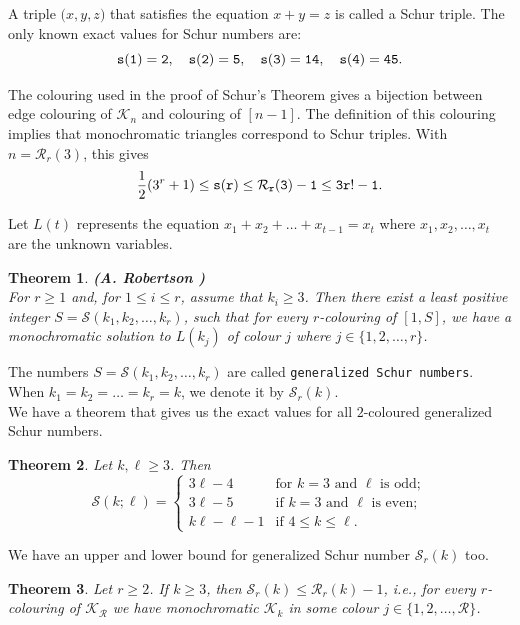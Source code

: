 \documentclass[12pt]{report}
\def\K{\mathcal K}
\def\R{\mathcal R}
\def\S{\mathcal S}
\newtheorem{thm}{Theorem}[chapter]
\begin{document}
\noindent A triple $\big(x, y, z \big)$ that satisfies the equation $x+y=z$ is called a Schur triple. The only known exact values for Schur numbers are:
\[ \tt{s(1)}=2, \quad \tt{s(2)}=5, \quad \tt{s(3)}=14, \quad \tt{s(4)}=45. \]

\noindent The colouring used in the proof of Schur's Theorem gives a bijection between edge colouring of ${\K}_n$ and colouring of $[n-1]$. The definition of this colouring implies that monochromatic triangles correspond to Schur triples. With $n={\R}_r(3)$, this gives
\[ \frac{1}{2}(3^r+1) \le \tt s(r) \le {\R}_r(3)-1 \le 3r!-1. \]

\noindent Let $L(t)$ represents the equation $x_1+x_2+\ldots+x_{t-1}=x_t$ where $ x_1,x_2, \ldots ,x_t$ are the unknown variables.

\begin{thm}{\bf (A. Robertson \cite{AR})} \\[5pt]
For $r \ge 1$ and, for $1 \le i \le r$, assume that $k_i \ge 3$. Then there exist a least positive integer $S={\S}(k_1, k_2,\ldots,k_r) $, such that for every $r$-colouring of $[1,S]$, we have a monochromatic solution to $L(k_j)$ of colour $j$ where $j \in \{1,2,\ldots,r\}$.
\end{thm}

\noindent The numbers $S={\S}(k_1,k_2,\ldots,k_r)$ are called {\tt generalized Schur numbers}. When $k_1=k_2=\ldots=k_r=k$, we denote it by ${\S}_r(k)$.\\

\noindent We have a theorem that gives us the exact values for all $2$-coloured generalized Schur numbers.

\begin{thm}
Let $k,\ell \ge 3$. Then
\[ {\S}(k;\ell) = \left\{ \begin{array}{ll}
                            3\ell-4 & \mbox{for $k=3$ and $\ell$ is odd};\\
                            3\ell-5 & \mbox{if $k=3$ and $\ell$ is even};\\
                            k\ell-\ell-1 & \mbox{if $4 \leq k \leq \ell$}. 
                                  \end{array}
                \right.
\]  
\end{thm}

\noindent We have an upper and lower bound for generalized Schur number $\S_r(k)$ too.

\begin{thm}
Let $r \ge 2$. If $k \ge 3$, then $\S_r(k) \le \R_r(k)-1$, i.e., for every $r$-colouring of ${\K}_\R$ we have monochromatic ${\K}_k$ in some colour $j \in\{1,2,\ldots,\R\}$.
\end{thm}
\end{document}
